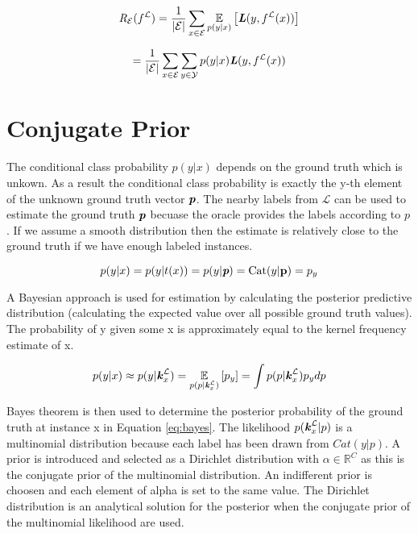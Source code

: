 \begin{equation}
\textit{R}_{\mathcal{E}}(f^{\mathcal{L}}) = \frac{1}{|\mathcal{E}|} \sum_{x \in \mathcal{E}} \underset{p(y|x)}{\mathbb{E}} \left[ \textbf{\textit{L}}(y,f^{\mathcal{L}}(x)) \right]
\end{equation}

\begin{equation}
= \frac{1}{|\mathcal{E}|} \sum_{x \in \mathcal{E}} \sum_{y \in \mathcal{Y}} p(y|x) \textbf{\textit{L}}(y,f^{\mathcal{L}}(x))
\end{equation}


\section{Conjugate Prior}

The conditional class probability $p(y|x)$ depends on the ground truth which is unkown. As a result the conditional class probability is exactly the y-th element of the unknown ground truth vector $\textit{\textbf{p}}$. The nearby labels from $\mathcal{L}$ can be used to estimate the ground truth $\textit{\textbf{p}}$ becuase the oracle provides the labels according to $\textit{p}$. If we assume a smooth distribution then the estimate is relatively close to the ground truth if we have enough labeled instances. 

\begin{equation}
p(y|x) = p(y|t(x)) = p(y|\textit{\textbf{p}}) = \text{Cat} (y|\textbf{p}) = p_y
\end{equation}

A Bayesian approach is used for estimation by calculating the posterior predictive distribution (calculating the expected value over all possible ground truth values). The probability of y given some x is approximately equal to the kernel frequency estimate of x. 

\begin{equation}
p(y|x) \approx  p(y | \textbf{\textit{k}}^{\mathcal{L}}_x) = \underset{p(p|\textbf{\textit{k}}^{\mathcal{L}}_x)}{\mathbb{E}} \left[ p_y \right] = \int p(p|\textbf{\textit{k}}^{\mathcal{L}}_x) p_y dp
\label{eq:kernel_estimate}
\end{equation}

Bayes theorem is then used to determine the posterior probability of the ground truth at instance x in Equation \ref{eq:bayes}. The likelihood $p(\textbf{\textit{k}}^{\mathcal{L}}_x|p)$ is a multinomial distribution because each label has been drawn from $Cat(y|p)$. A prior is introduced and selected as a Dirichlet distribution with $\alpha \in \mathbb{R}^C$ as this is the conjugate prior of the multinomial distribution. An indifferent prior is choosen and each element of alpha is set to the same value. The Dirichlet distribution is an analytical solution for the posterior when the conjugate prior of the multinomial likelihood are used. 


